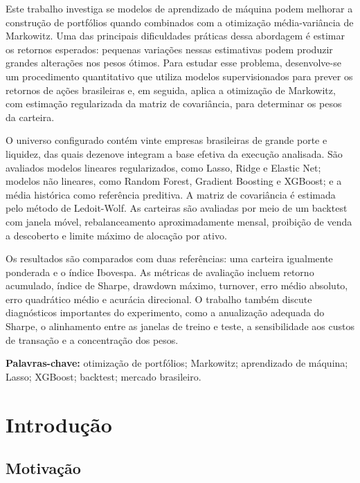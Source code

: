 \documentclass[12pt,a4paper]{article}
\begin{document}
Este trabalho investiga se modelos de aprendizado de máquina podem melhorar a construção de portfólios quando combinados com a otimização média-variância de Markowitz. Uma das principais dificuldades práticas dessa abordagem é estimar os retornos esperados: pequenas variações nessas estimativas podem produzir grandes alterações nos pesos ótimos. Para estudar esse problema, desenvolve-se um procedimento quantitativo que utiliza modelos supervisionados para prever os retornos de ações brasileiras e, em seguida, aplica a otimização de Markowitz, com estimação regularizada da matriz de covariância, para determinar os pesos da carteira.

O universo configurado contém vinte empresas brasileiras de grande porte e liquidez, das quais dezenove integram a base efetiva da execução analisada. São avaliados modelos lineares regularizados, como Lasso, Ridge e Elastic Net; modelos não lineares, como Random Forest, Gradient Boosting e XGBoost; e a média histórica como referência preditiva. A matriz de covariância é estimada pelo método de Ledoit-Wolf. As carteiras são avaliadas por meio de um backtest com janela móvel, rebalanceamento aproximadamente mensal, proibição de venda a descoberto e limite máximo de alocação por ativo.

Os resultados são comparados com duas referências: uma carteira igualmente ponderada e o índice Ibovespa. As métricas de avaliação incluem retorno acumulado, índice de Sharpe, drawdown máximo, turnover, erro médio absoluto, erro quadrático médio e acurácia direcional. O trabalho também discute diagnósticos importantes do experimento, como a anualização adequada do Sharpe, o alinhamento entre as janelas de treino e teste, a sensibilidade aos custos de transação e a concentração dos pesos.

\textbf{Palavras-chave:} otimização de portfólios; Markowitz; aprendizado de máquina; Lasso; XGBoost; backtest; mercado brasileiro.

\newpage

\tableofcontents
\newpage

\section{Introdução}

\subsection{Motivação}
\end{document}

